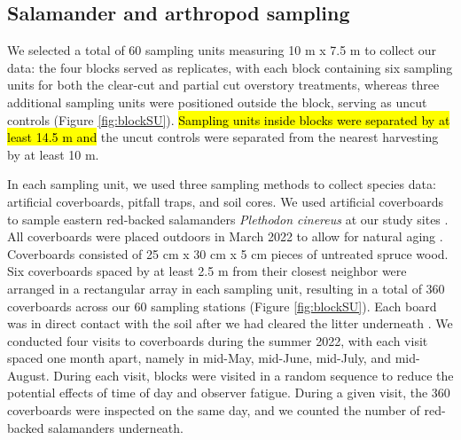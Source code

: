 \subsection*{Salamander and arthropod sampling}
\label{subsec:sampling}

We selected a total of 60 sampling units measuring 10 m x 7.5 m to collect our data: the four blocks served as replicates, 
with each block containing six sampling units for both the clear-cut and partial cut overstory treatments, 
whereas three additional sampling units were positioned outside the block, serving as uncut controls (Figure \ref*{fig:blockSU}). 
\hl{Sampling units inside blocks were separated by at least 14.5 m and} the uncut controls were separated from the nearest harvesting by at least 10 m.

In each sampling unit, we used three sampling methods to collect species data: artificial coverboards, pitfall traps, and soil cores. 
We used artificial coverboards to sample eastern red-backed salamanders \textit{Plethodon cinereus} at our study sites \citep{hydeSamplingPlethodontidSalamanders2001,mooreComparisonPopulationEastern2009c,hesedUncoveringSalamanderEcology2012,Mazerolle2021Woodlandsalamander}. 
All coverboards were placed outdoors in March 2022 to allow for natural aging \citep{hedrickEffectsCoverboardAge2021,Grasser2014Effectscover}. 
Coverboards consisted of 25 cm x 30 cm x 5 cm pieces of untreated spruce wood. 
Six coverboards spaced by at least 2.5 m from their closest neighbor were arranged in a rectangular array in each sampling unit, resulting in a total of 360 coverboards across our 60 sampling stations (Figure \ref{fig:blockSU}). 
Each board was in direct contact with the soil after we had cleared the litter underneath \citep{Mazerolle2021Woodlandsalamander}. 
We conducted four visits to coverboards during the summer 2022, with each visit spaced one month apart, namely in mid-May, mid-June, mid-July, and mid-August. 
During each visit, blocks were visited in a random sequence to reduce the potential effects of time of day and observer fatigue. 
During a given visit, the 360 coverboards were inspected on the same day, and we counted the number of red-backed salamanders underneath. 

